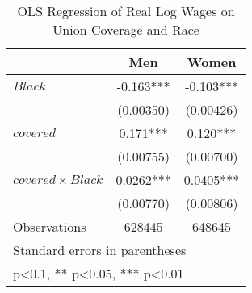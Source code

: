 \begin{table}[htbp]\centering
\def\sym#1{\ifmmode^{#1}\else\(^{#1}\)\fi}
\caption{OLS Regression of Real Log Wages on Union Coverage and Race}
\begin{tabular}{l*{2}{c}}
\hline\hline
                    &\multicolumn{1}{c}{Men}&\multicolumn{1}{c}{Women}\\
\hline
$ Black $           &      -0.163***&      -0.103***\\
                    &   (0.00350)   &   (0.00426)   \\
[1em]
$ covered $         &       0.171***&       0.120***\\
                    &   (0.00755)   &   (0.00700)   \\
[1em]
$ covered \times Black $&      0.0262***&      0.0405***\\
                    &   (0.00770)   &   (0.00806)   \\
\hline
Observations        &      628445   &      648645   \\
\hline\hline
\multicolumn{3}{l}{\footnotesize Standard errors in parentheses}\\
\multicolumn{3}{l}{\footnotesize * p<0.1, ** p<0.05, *** p<0.01}\\
\end{tabular}
\end{table}
